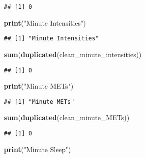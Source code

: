 \documentclass[
]{article}
\newenvironment{Shaded}{\begin{snugshade}}{\end{snugshade}}
\newcommand{\FunctionTok}[1]{\textcolor[rgb]{0.13,0.29,0.53}{\textbf{#1}}}
\newcommand{\NormalTok}[1]{#1}
\newcommand{\StringTok}[1]{\textcolor[rgb]{0.31,0.60,0.02}{#1}}
\begin{document}
\begin{verbatim}
## [1] 0
\end{verbatim}

\begin{Shaded}
\begin{Highlighting}[]
\FunctionTok{print}\NormalTok{(}\StringTok{"Minute Intensities"}\NormalTok{)}
\end{Highlighting}
\end{Shaded}

\begin{verbatim}
## [1] "Minute Intensities"
\end{verbatim}

\begin{Shaded}
\begin{Highlighting}[]
\FunctionTok{sum}\NormalTok{(}\FunctionTok{duplicated}\NormalTok{(clean\_minute\_intensities))}
\end{Highlighting}
\end{Shaded}

\begin{verbatim}
## [1] 0
\end{verbatim}

\begin{Shaded}
\begin{Highlighting}[]
\FunctionTok{print}\NormalTok{(}\StringTok{"Minute METs"}\NormalTok{)}
\end{Highlighting}
\end{Shaded}

\begin{verbatim}
## [1] "Minute METs"
\end{verbatim}

\begin{Shaded}
\begin{Highlighting}[]
\FunctionTok{sum}\NormalTok{(}\FunctionTok{duplicated}\NormalTok{(clean\_minute\_METs))}
\end{Highlighting}
\end{Shaded}

\begin{verbatim}
## [1] 0
\end{verbatim}

\begin{Shaded}
\begin{Highlighting}[]
\FunctionTok{print}\NormalTok{(}\StringTok{"Minute Sleep"}\NormalTok{)}
\end{Highlighting}
\end{Shaded}
\end{document}
